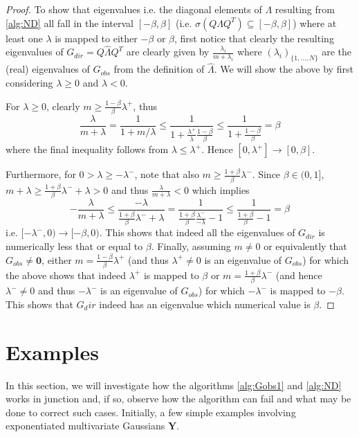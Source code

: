 \documentclass[../Thesis.tex]{subfiles}
\begin{document}
\begin{proof}
    To show that eigenvalues i.e. the diagonal elements of $\Lambda$ resulting from \autoref{alg:ND} all fall in the interval $[-\beta, \beta]$ (i.e. $\sigma\left(Q \Lambda Q^T\right) \subseteq [-\beta, \beta]$) where at least one $\lambda$ is mapped to either $-\beta$ or $\beta$, first notice that clearly the resulting eigenvalues of $G_{dir} = Q \hat{\Lambda} Q^T$ are clearly given by $\frac{\lambda_i}{m + \lambda_i}$ where $(\lambda_i)_{\{1,\dots, N\}}$ are the (real) eigenvalues of $G_{obs}$ from the definition of $\hat{\Lambda}$. We will show the above by first considering $\lambda \geq 0$ and $\lambda < 0$.

    For $\lambda \geq 0$, clearly $m \geq \frac{1-\beta}{\beta} \lambda^+$, thus
    $$\frac{\lambda}{m + \lambda} = \frac{1}{1 + m/\lambda} \leq \frac{1}{1 + \frac{\lambda^+}{\lambda} \frac{1-\beta}{\beta}} \leq \frac{1}{1 + \frac{1-\beta}{\beta}} = \beta$$
    where the final inequality follows from $\lambda \leq \lambda^+$. Hence $[0,\lambda^+] \to [0, \beta]$.

    Furthermore, for $0 > \lambda \geq -\lambda^- $, note that also $m \geq \frac{1+\beta}{\beta} \lambda^-$. Since $\beta \in (0,1]$, $m + \lambda \geq \frac{1 + \beta}{\beta} \lambda^- + \lambda> 0$ and thus $\frac{\lambda}{m + \lambda} < 0$ which implies
        $$- \frac{\lambda}{m + \lambda} \leq  \frac{- \lambda}{\frac{1 + \beta}{\beta}\lambda^- + \lambda} = \frac{1}{\frac{1+ \beta}{\beta} \frac{\lambda^-}{-\lambda} - 1} \leq \frac{1}{ \frac{1+\beta}{\beta} - 1} = \beta$$
        i.e. $[-\lambda^-,0) \to [-\beta, 0)$. This shows that indeed all the eigenvalues of $G_{dir}$ is numerically less that or equal to $\beta$. Finally, assuming $m\neq 0$ or equivalently that $G_{obs} \neq \mathbf{0}$, either $m = \frac{1-\beta}{\beta}\lambda^+$ (and thus $\lambda^+ \neq 0$ is an eigenvalue of $G_{obs}$) for which the above shows that indeed $\lambda^+$ is mapped to $\beta$ or $m = \frac{1+\beta}{\beta} \lambda^-$ (and hence $\lambda^- \neq 0$ and thus $-\lambda^-$ is an eigenvalue of $G_{obs}$) for which $-\lambda^-$ is mapped to $-\beta$. This shows that $G_dir$ indeed has an eigenvalue which numerical value is $\beta$.
\end{proof}



\newpage
\section{Examples}
In this section, we will investigate how the algorithms \autoref{alg:Gobs1} and \autoref{alg:ND} works in junction and, if so, observe how the algorithm can fail and what may be done to correct such cases. Initially, a few simple examples involving exponentiated multivariate Gaussians $\boldsymbol Y $.
\end{document}
